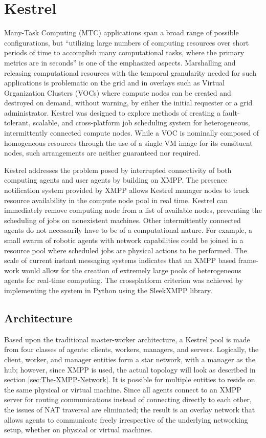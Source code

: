 \chapter{Kestrel}
\label{chap:Kestrel} 

Many-Task Computing (MTC) applications span a broad range of possible
configurations, but ``utilizing large numbers of computing resources over short
periods of time to accomplish many computational tasks, where the primary
metrics are in seconds'' \cite{Raicu2008} is one of the emphasized aspects.
Marshalling and releasing computational resources with the temporal granularity
needed for such applications is problematic on the grid and in overlays such
as Virtual Organization Clusters (VOCs) where compute nodes can be created
and destroyed on demand, without warning, by either the initial requester or
a grid administrator. Kestrel was designed to explore methods of creating
a fault-tolerant, scalable, and cross-platform job scheduling system for
heterogeneous, intermittently connected compute nodes. While a VOC is nominally
composed of homogeneous resources through the use of a single VM image for its
consituent nodes, such arrangements are neither guaranteed nor required.

Kestrel addresses the problem posed by interrupted connectivity of both
computing agents and user agents by building on XMPP. The presence notification
system provided by XMPP allows Kestrel manager nodes to track resource
availability in the compute node pool in real time. Kestrel can immediately
remove computing node from a list of available nodes, preventing the scheduling
of jobs on nonexistent machines. Other intermittently connected agents do not
necessarily have to be of a computational nature. For example, a small swarm
of robotic agents with network capabilities could be joined in a resource pool
where scheduled jobs are physical actions to be performed. The scale of current
instant messaging systems indicates that an XMPP based frame- work would allow
for the creation of extremely large pools of heterogeneous agents for real-time
computing. The crossplatform criterion was achieved by implementing the system
in Python using the SleekXMPP \cite{SleekXMPP} library.

\section{Architecture}
Based upon the traditional master-worker architecture, a Kestrel pool is made
from four classes of agents: clients, workers, managers, and servers. Logically,
the client, worker, and manager entities form a star network, with a manager as
the hub; however, since XMPP is used, the actual topology will look as described
in section \ref{sec:The-XMPP-Network}. It is possible for multiple entities to
reside on the same physical or virtual machine. Since all agents connect to an
XMPP server for routing communications instead of connecting directly to each
other, the issues of NAT traversal are eliminated; the result is an overlay
network that allows agents to communicate freely irrespective of the underlying
networking setup, whether on physical or virtual machines.

